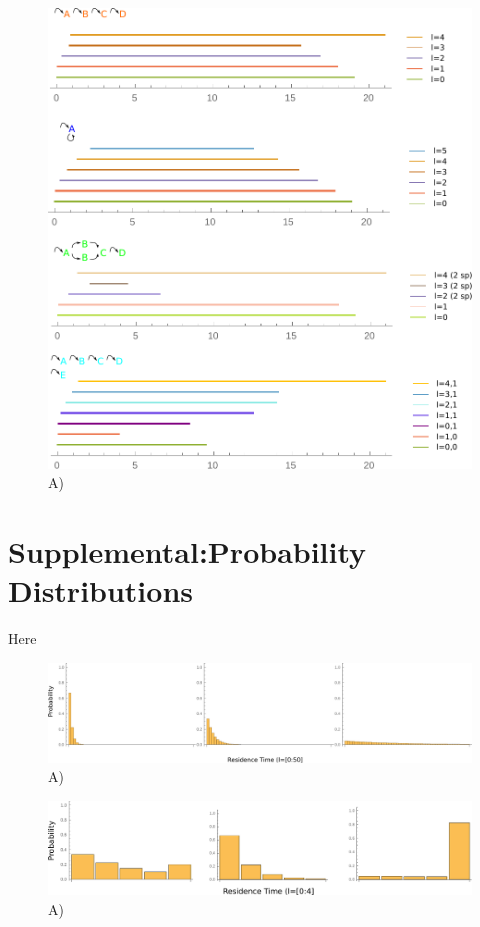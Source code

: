 \documentclass{article}
\begin{document}
\begin{figure}[H]
    \includegraphics[width=\textwidth]{Supp_1.pdf}
	\caption{A)}
\end{figure}

\section*{Supplemental:Probability Distributions}
Here
\begin{figure}[H]
    \includegraphics[width=\textwidth]{Supp_2.pdf}
	\caption{A)}
\end{figure}

\begin{figure}[H]
    \includegraphics[width=\textwidth]{Supp_3.pdf}
	\caption{A)}
\end{figure}
\end{document}
